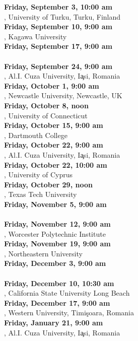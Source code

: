 \documentclass[a4paper]{article}
\begin{document}
\begin{minipage}{0.95\textwidth}
\begin{minipage}[b]{0.47\textwidth}
{\leavevmode \raggedright
\textbf{\color{cprimary}Friday, September 3, 10:00 am}\\ , University of Turku, Turku, Finland\\
\textbf{\color{cprimary}Friday, September 10, 9:00 am}\\ , Kagawa University\\
\textbf{\color{cprimary}Friday, September 17, 9:00 am}\\ \\
\textbf{\color{cprimary}Friday, September 24, 9:00 am}\\ , Al.I. Cuza University, I\c{a}si, Romania\\
\textbf{\color{cprimary}Friday, October 1, 9:00 am}\\ , Newcastle University, Newcastle, UK\\
\textbf{\color{cprimary}Friday, October 8, noon}\\ , University of Connecticut\\
\textbf{\color{cprimary}Friday, October 15, 9:00 am}\\ , Dartmouth College\\
\textbf{\color{cprimary}Friday, October 22, 9:00 am}\\ , Al.I. Cuza University, I\c{a}si, Romania\\
\textbf{\color{cprimary}Friday, October 22, 10:00 am}\\ , University of Cyprus\\
\textbf{\color{cprimary}Friday, October 29, noon}\\ , Texas Tech University\\
\textbf{\color{cprimary}Friday, November 5, 9:00 am}\\ \\
\textbf{\color{cprimary}Friday, November 12, 9:00 am}\\ , Worcester Polytechnic Institute\\
\textbf{\color{cprimary}Friday, November 19, 9:00 am}\\ , Northeastern University\\
\textbf{\color{cprimary}Friday, December 3, 9:00 am}\\ \\
\textbf{\color{cprimary}Friday, December 10, 10:30 am}\\ , California State University Long Beach\\
\textbf{\color{cprimary}Friday, December 17, 9:00 am}\\ , Western University, Timi\c{s}oara, Romania\\
\textbf{\color{cprimary}Friday, January 21, 9:00 am}\\ , Al.I. Cuza University, I\c{a}si, Romania
\par{}
}


\end{minipage}
\end{minipage}
\end{document}
